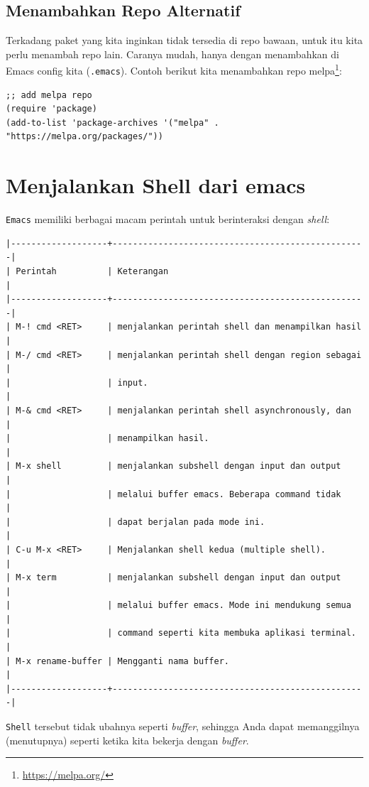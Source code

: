 \documentclass{article}
\begin{document}
\subsection{Menambahkan Repo Alternatif}

Terkadang paket yang kita inginkan tidak tersedia di repo bawaan,
untuk itu kita perlu menambah repo lain. Caranya mudah, hanya 
dengan menambahkan di Emacs config kita (\verb=.emacs=). Contoh
berikut kita menambahkan repo melpa\footnote{\url{https://melpa.org/}}:

\begin{verbatim}
;; add melpa repo
(require 'package)
(add-to-list 'package-archives '("melpa" . "https://melpa.org/packages/"))
\end{verbatim}

\section{Menjalankan Shell dari emacs}
\verb=Emacs= memiliki berbagai macam perintah untuk berinteraksi dengan
\emph{shell}:

\begin{verbatim}
|-------------------+--------------------------------------------------|
| Perintah          | Keterangan                                       |
|-------------------+--------------------------------------------------|
| M-! cmd <RET>     | menjalankan perintah shell dan menampilkan hasil |
| M-/ cmd <RET>     | menjalankan perintah shell dengan region sebagai |
|                   | input.                                           |
| M-& cmd <RET>     | menjalankan perintah shell asynchronously, dan   |
|                   | menampilkan hasil.                               |
| M-x shell         | menjalankan subshell dengan input dan output     |
|                   | melalui buffer emacs. Beberapa command tidak     |
|                   | dapat berjalan pada mode ini.                    |
| C-u M-x <RET>     | Menjalankan shell kedua (multiple shell).        |
| M-x term          | menjalankan subshell dengan input dan output     |
|                   | melalui buffer emacs. Mode ini mendukung semua   |
|                   | command seperti kita membuka aplikasi terminal.  |
| M-x rename-buffer | Mengganti nama buffer.                           |
|-------------------+--------------------------------------------------|
\end{verbatim}

\verb=Shell= tersebut tidak ubahnya seperti \emph{buffer}, sehingga Anda dapat 
memanggilnya (menutupnya) seperti ketika kita bekerja dengan \emph{buffer}.
\end{document}
